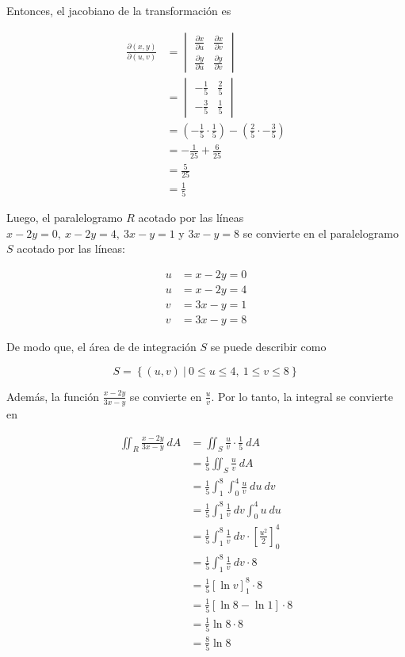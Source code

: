 \documentclass[12pt]{exam}
\begin{document}
\begin{questions}
  Entonces, el jacobiano de la transformación es

  \begin{align*}
    \frac{\partial(x, y)}{\partial(u, v)}
    &= \begin{vmatrix}
      \frac{\partial x}{\partial u} & \frac{\partial x}{\partial v}\\
      \frac{\partial y}{\partial u} & \frac{\partial y}{\partial v}
    \end{vmatrix}\\
    &= \begin{vmatrix}
      -\frac{1}{5} & \frac{2}{5}\\
      -\frac{3}{5} & \frac{1}{5}
    \end{vmatrix}\\
    &= \left(-\frac{1}{5} \cdot \frac{1}{5}\right) - \left(\frac{2}{5} \cdot -\frac{3}{5}\right)\\
    &= -\frac{1}{25} + \frac{6}{25} \\
    &= \frac{5}{25} \\
    &= \frac{1}{5}
  \end{align*}

  Luego, el paralelogramo $R$ acotado por las líneas $x - 2y = 0,~ x - 2y = 4, ~3x - y = 1$ y $3x - y = 8$ 
  se convierte en el paralelogramo $S$ acotado por las líneas: 

  \begin{align*}
    u &= x - 2y = 0\\
    u &= x - 2y = 4\\
    v &= 3x - y = 1\\
    v &= 3x - y = 8
  \end{align*}

  De modo que, el área de de integración $S$ se puede describir como

  \[
  S = \left\{(u, v)~|~0 \leq u \leq 4,~1 \leq v \leq 8\right\}
  \]

  Además, la función $\frac{x-2y}{3x-y}$ se convierte en $\frac{u}{v}$. Por lo tanto, la integral se convierte en

  \begin{align*}
    \iint_R \frac{x-2y}{3x-y}~dA
    &= \iint_S \frac{u}{v} \cdot \frac{1}{5}~dA\\
    &= \frac{1}{5} \iint_S \frac{u}{v}~dA\\
    &= \frac{1}{5} \int_{1}^{8}\int_{0}^{4} \frac{u}{v}~du~dv\\
    &= \frac{1}{5} \int_{1}^{8} \frac{1}{v} ~ dv \int_{0}^{4} u~du\\
    &= \frac{1}{5} \int_{1}^{8} \frac{1}{v} ~ dv \cdot \left[\frac{u^2}{2}\right]_{0}^{4}\\
    &= \frac{1}{5} \int_{1}^{8} \frac{1}{v} ~ dv \cdot 8\\
    &= \frac{1}{5} \left[\ln{v}\right]_{1}^{8} \cdot 8\\
    &= \frac{1}{5} \left[\ln{8} - \ln{1}\right] \cdot 8\\
    &= \frac{1}{5} \ln{8} \cdot 8\\
    &= \frac{8}{5} \ln{8}
  \end{align*}


\end{questions}
\end{document}
